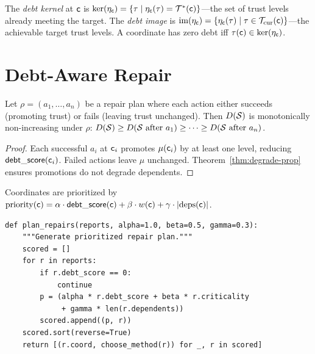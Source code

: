 \documentclass[11pt]{article}
\newcommand{\DebtScore}{\mathsf{debt\_score}}
\begin{document}
\begin{definition}\label{def:debt-kernel}
The \emph{debt kernel} at $\mathsf{c}$ is
$\ker(\eta_{\mathsf{c}}) = \{\tau \mid \eta_{\mathsf{c}}(\tau) =
\mathcal{T}^*(\mathsf{c})\}$---the set of trust levels already meeting
the target.  The \emph{debt image} is
$\mathrm{im}(\eta_{\mathsf{c}}) = \{\eta_{\mathsf{c}}(\tau) \mid \tau \in
\mathcal{T}_{\mathrm{cur}}(\mathsf{c})\}$---the achievable target trust
levels.  A coordinate has zero debt iff
$\tau(\mathsf{c}) \in \ker(\eta_{\mathsf{c}})$.
\end{definition}



\section{Debt-Aware Repair}\label{sec:repair}

\begin{theorem}\label{thm:repair-convergence}
Let $\rho = (a_1, \ldots, a_n)$ be a repair plan where each action
either succeeds (promoting trust) or fails (leaving trust unchanged).
Then $D(\mathcal{S})$ is monotonically non-increasing under $\rho$:
$D(\mathcal{S}) \geq D(\mathcal{S}\text{ after }a_1) \geq \cdots \geq
D(\mathcal{S}\text{ after }a_n)$.
\end{theorem}

\begin{proof}
Each successful $a_i$ at $\mathsf{c}_i$ promotes $\mu(\mathsf{c}_i)$ by at
least one level, reducing $\DebtScore(\coord_i)$.  Failed actions
leave $\mu$ unchanged.  Theorem~\ref{thm:degrade-prop} ensures
promotions do not degrade dependents.
\end{proof}

Coordinates are prioritized by $\mathrm{priority}(\coord) =
\alpha \cdot \DebtScore(\coord) + \beta \cdot w(\coord) +
\gamma \cdot |\mathrm{deps}(\coord)|$.

\begin{lstlisting}[style=jugeo-python]
def plan_repairs(reports, alpha=1.0, beta=0.5, gamma=0.3):
    """Generate prioritized repair plan."""
    scored = []
    for r in reports:
        if r.debt_score == 0:
            continue
        p = (alpha * r.debt_score + beta * r.criticality
             + gamma * len(r.dependents))
        scored.append((p, r))
    scored.sort(reverse=True)
    return [(r.coord, choose_method(r)) for _, r in scored]
\end{lstlisting}
\end{document}
